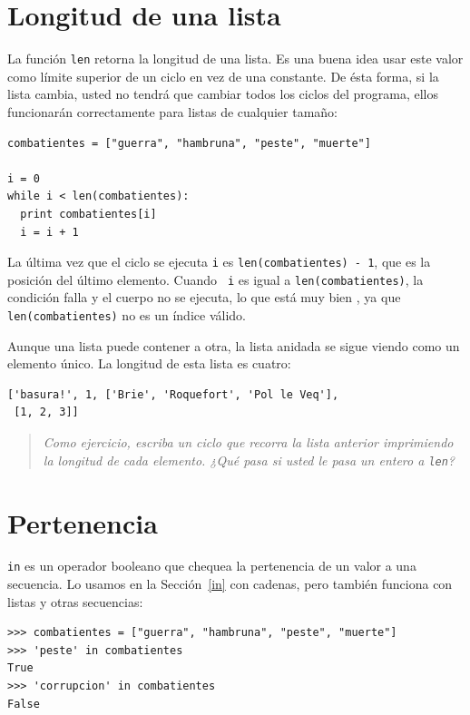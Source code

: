 \section{Longitud de una lista}

La función \texttt{len} retorna la longitud de una lista.  Es una buena
idea usar este valor como límite superior de un ciclo en vez de una
constante. De ésta forma, si la lista cambia, usted no tendrá que
cambiar todos los ciclos del programa, ellos funcionarán correctamente
para listas de cualquier tamaño:


\beforeverb
\begin{verbatim}
combatientes = ["guerra", "hambruna", "peste", "muerte"]

i = 0
while i < len(combatientes):
  print combatientes[i]
  i = i + 1
\end{verbatim}
\afterverb
%
La última vez que el ciclo se ejecuta \texttt{i} es \texttt{len(combatientes) - 1}, 
que es la posición del último  elemento.  Cuando {\tt
i} es igual a \texttt{len(combatientes)}, la condición falla y el cuerpo no se
ejecuta, lo que está muy bien , ya que \texttt{len(combatientes)} no es un 
índice válido.

Aunque una lista puede contener a otra, la lista anidada se sigue
viendo como un elemento único. La longitud de esta lista es cuatro:

\beforeverb
\begin{verbatim}
['basura!', 1, ['Brie', 'Roquefort', 'Pol le Veq'], 
 [1, 2, 3]]
\end{verbatim}
\afterverb
%
\begin{quote}
{\em Como ejercicio, escriba un ciclo que recorra la lista anterior
imprimiendo la longitud de cada elemento. ¿Qué pasa si usted
le pasa un entero a  \texttt{len}?}
\end{quote}


\section{Pertenencia}

\texttt{in} es un operador booleano que chequea la pertenencia de un valor
a una secuencia. Lo usamos en la Sección~\ref{in} con cadenas, pero también
funciona con listas y otras  secuencias:

\beforeverb
\begin{verbatim}
>>> combatientes = ["guerra", "hambruna", "peste", "muerte"]
>>> 'peste' in combatientes
True
>>> 'corrupcion' in combatientes
False
\end{verbatim}
\afterverb

